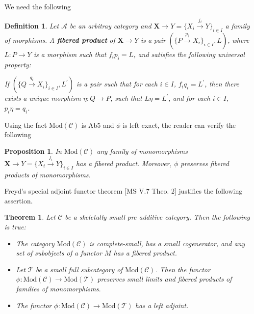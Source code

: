 \documentclass{amsart}
\newtheorem{theorem}{Theorem}
\theoremstyle{plain}
\newtheorem{definition}{Definition}
\newtheorem{proposition}{Proposition}
\numberwithin{equation}{section}
\begin{document}
We need the following

\begin{definition}
Let $\mathcal{A}$ be an arbitray category and $\mathbf{X}\rightarrow
Y=\{X_{i}\xrightarrow{f_i}Y\}_{i\in I}$ a family of morphisms. A \textbf{fibered product} of $\mathbf{X}\rightarrow Y$ is a pair $(\{P\xrightarrow{p_i}X_{i}\}_{i\in I},L)$, where $L:P\rightarrow Y$ is a
morphism such that $f_{i}p_{i}=L$, and satisfies the following universal
property:

If $(\{Q\xrightarrow{q_i}X_{i}\}_{i\in I},L^{\prime })$ is a pair such that
for each $i\in I$, $f_{i}q_{i}=L^{\prime }$, then there exists a unique
morphism $\eta :Q\rightarrow P$, such that $L\eta =L^{\prime}$, and for each
$i\in I$, $p_{i}\eta =q_{i}$.
\end{definition}

Using the fact $\mathrm{\mathrm{Mod}}(\mathcal{C})$ is Ab5 and $\phi $ is
left exact, the reader can verify the following

\begin{proposition}
In $\mathrm{Mod}(\mathcal{C})$ any family of monomorphisms $\mathbf{X}\rightarrow Y=\{X_{i}\xrightarrow{f_i}Y\}_{i\in I}$ has a fibered product.
Moreover, $\phi $ preserves fibered products of monomorphisms.
\end{proposition}

Freyd's special adjoint functor theorem [MS V.7 Theo. 2] justifies the
following assertion.

\begin{theorem}
\label{AD13} Let $\mathcal{C}$ be a skeletally small pre additive category.
Then the following is true:

\begin{itemize}
\item[(a)] The category $\mathrm{Mod}(\mathcal{C})$ is complete-small, has a
small cogenerator, and any set of subobjects of a functor $M$ has a fibered
product.

\item[(b)] Let $\mathcal{T}$ be a small full subcategory of $\mathrm{Mod}(\mathcal{C}) $. Then the functor $\phi :\mathrm{Mod}(\mathcal{C})\rightarrow
\mathrm{Mod}(\mathcal{T})$ preserves small limits and fibered products of
families of monomorphisms.

\item[(c)] The functor $\phi :\mathrm{Mod}(\mathcal{C})\rightarrow \mathrm{Mod}(\mathcal{T})$ has a left adjoint.
\end{itemize}
\end{theorem}
\end{document}

